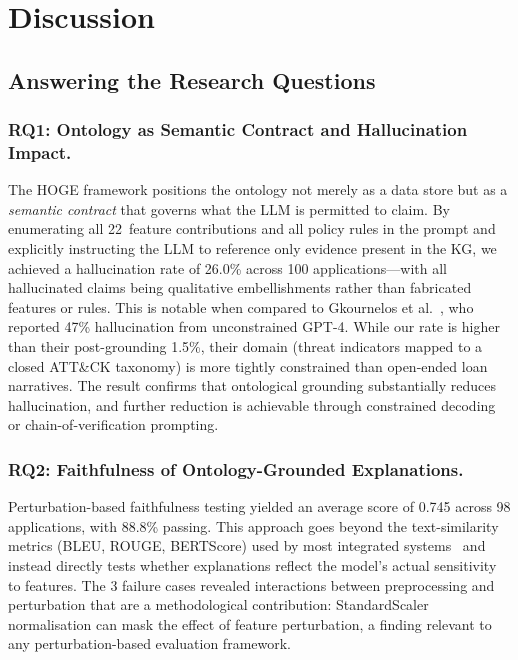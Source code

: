 \documentclass[lnbip]{svmultln}
\begin{document}
\section{Discussion}
\label{sec:discussion}

\subsection{Answering the Research Questions}

\subsubsection{RQ1: Ontology as Semantic Contract and Hallucination Impact.}
The HOGE framework positions the ontology not merely as a data store but as a \emph{semantic contract} that governs what the LLM is permitted to claim. By enumerating all 22~feature contributions and all policy rules in the prompt and explicitly instructing the LLM to reference only evidence present in the KG, we achieved a hallucination rate of 26.0\% across 100 applications---with all hallucinated claims being qualitative embellishments rather than fabricated features or rules. This is notable when compared to Gkournelos et al.~\cite{threat2025}, who reported 47\% hallucination from unconstrained GPT-4. While our rate is higher than their post-grounding 1.5\%, their domain (threat indicators mapped to a closed ATT\&CK taxonomy) is more tightly constrained than open-ended loan narratives. The result confirms that ontological grounding substantially reduces hallucination, and further reduction is achievable through constrained decoding or chain-of-verification prompting.

\subsubsection{RQ2: Faithfulness of Ontology-Grounded Explanations.}
Perturbation-based faithfulness testing yielded an average score of 0.745 across 98 applications, with 88.8\% passing. This approach goes beyond the text-similarity metrics (BLEU, ROUGE, BERTScore) used by most integrated systems~\cite{gdm2026,medsum2026,medkgcot2025} and instead directly tests whether explanations reflect the model's actual sensitivity to features. The 3 failure cases revealed interactions between preprocessing and perturbation that are a methodological contribution: StandardScaler normalisation can mask the effect of feature perturbation, a finding relevant to any perturbation-based evaluation framework.
\end{document}
